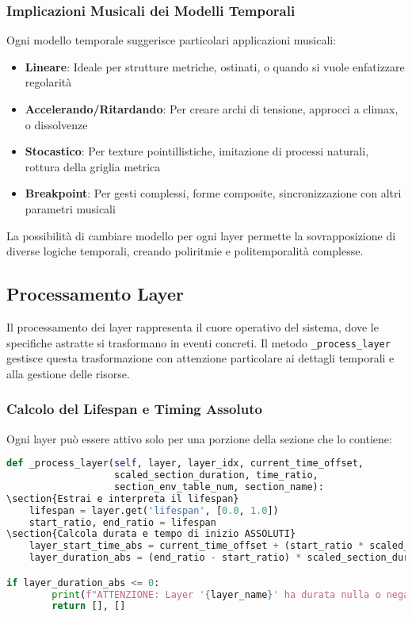 \subsubsection{Implicazioni Musicali dei Modelli Temporali}
Ogni modello temporale suggerisce particolari applicazioni musicali:

\begin{itemize}
    \item \textbf{Lineare}: Ideale per strutture metriche, ostinati, o quando si vuole enfatizzare regolarità
    \item \textbf{Accelerando/Ritardando}: Per creare archi di tensione, approcci a climax, o dissolvenze
    \item \textbf{Stocastico}: Per texture pointillistiche, imitazione di processi naturali, rottura della griglia metrica
    \item \textbf{Breakpoint}: Per gesti complessi, forme composite, sincronizzazione con altri parametri musicali
\end{itemize}

La possibilità di cambiare modello per ogni layer permette la sovrapposizione di diverse logiche temporali, creando poliritmie e politemporalità complesse.
\subsection{Processamento Layer}
Il processamento dei layer rappresenta il cuore operativo del sistema, dove le specifiche astratte si trasformano in eventi concreti. Il metodo \texttt{\_process\_layer} gestisce questa trasformazione con attenzione particolare ai dettagli temporali e alla gestione delle risorse.
\subsubsection{Calcolo del Lifespan e Timing Assoluto}
Ogni layer può essere attivo solo per una porzione della sezione che lo contiene:

\begin{lstlisting}[language=Python]
def _process_layer(self, layer, layer_idx, current_time_offset, 
                   scaled_section_duration, time_ratio, 
                   section_env_table_num, section_name):
\section{Estrai e interpreta il lifespan}
    lifespan = layer.get('lifespan', [0.0, 1.0])
    start_ratio, end_ratio = lifespan
\section{Calcola durata e tempo di inizio ASSOLUTI}
    layer_start_time_abs = current_time_offset + (start_ratio * scaled_section_duration)
    layer_duration_abs = (end_ratio - start_ratio) * scaled_section_duration

if layer_duration_abs <= 0:
        print(f"ATTENZIONE: Layer '{layer_name}' ha durata nulla o negativa.")
        return [], []
\end{lstlisting}

